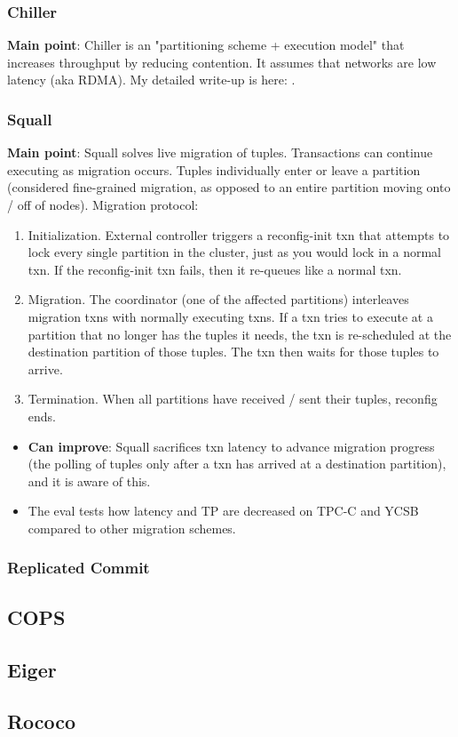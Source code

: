 \subsubsection{Chiller}
\textbf{Main point}: Chiller \cite{chiller} is an "partitioning scheme + execution model" that increases throughput by reducing contention. It assumes that networks are low latency (aka RDMA). My detailed write-up is here: \cite{jennchiller}.

\subsubsection{Squall}
\textbf{Main point}: Squall \cite{squall} solves live migration of tuples. Transactions can continue executing as migration occurs. Tuples individually enter or leave a partition (considered fine-grained migration, as opposed to an entire partition moving onto / off of nodes). Migration protocol:
\begin{enumerate}
    \item Initialization. External controller triggers a reconfig-init txn that attempts to lock every single partition in the cluster, just as you would lock in a normal txn. If the reconfig-init txn fails, then it re-queues like a normal txn. 
    \item Migration. The coordinator (one of the affected partitions) interleaves migration txns with normally executing txns. If a txn tries to execute at a partition that no longer has the tuples it needs, the txn is re-scheduled at the destination partition of those tuples. The txn then waits for those tuples to arrive.
    \item Termination. When all partitions have received / sent their tuples, reconfig ends.
\end{enumerate}
\begin{itemize}
    \item \textbf{Can improve}: Squall sacrifices txn latency to advance migration progress (the polling of tuples only after a txn has arrived at a destination partition), and it is aware of this.
    \item The eval tests how latency and TP are decreased on TPC-C and YCSB compared to other migration schemes.
\end{itemize}

\subsubsection{Replicated Commit}
\cite{replicatedcommit}
\subsection{COPS}
\cite{cops}
\subsection{Eiger}
\cite{eiger}
\subsection{Rococo}
\cite{rococo}